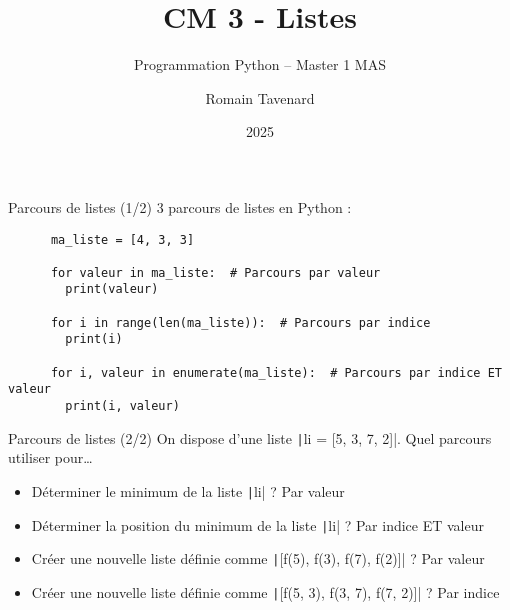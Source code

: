 \documentclass[10pt]{beamer}
\title[M1 MAS -- Python -- Listes]{CM 3 - Listes}
\subtitle{Programmation Python -- Master 1 MAS}
\author{Romain Tavenard}
\date{2025}
\institute{%
\hypersetup{urlcolor=.}
\makebox[2.2ex][c]{\faEnvelope}\enspace\href{mailto:romain.tavenard@univ-rennes2.fr}{\texttt{romain.tavenard@univ-rennes2.fr}}\\%
}
\begin{document}
\maketitle


\begin{frame}[fragile]{Parcours de listes (1/2)}  
  3 parcours de listes en Python :

  \begin{beamercodeblock}
    \begin{verbatim}
      ma_liste = [4, 3, 3]

      for valeur in ma_liste:  # Parcours par valeur
        print(valeur)
      
      for i in range(len(ma_liste)):  # Parcours par indice
        print(i)
      
      for i, valeur in enumerate(ma_liste):  # Parcours par indice ET valeur
        print(i, valeur)
    \end{verbatim}
  \end{beamercodeblock}
\end{frame}

\begin{frame}[fragile]{Parcours de listes (2/2)}  
  On dispose d'une liste \texttt|li = [5, 3, 7, 2]|.
  Quel parcours utiliser pour\dots

  \begin{itemize}
    \item Déterminer le minimum de la liste \texttt|li| ? \pause \alert{Par valeur}
    \item Déterminer la position du minimum de la liste \texttt|li| ? \pause \alert{Par indice ET valeur}
    \item Créer une nouvelle liste définie comme \texttt|[f(5), f(3), f(7), f(2)]| ? \pause \alert{Par valeur}
    \item Créer une nouvelle liste définie comme \texttt|[f(5, 3), f(3, 7), f(7, 2)]| ? \pause \alert{Par indice}
  \end{itemize}
\end{frame}
\end{document}
